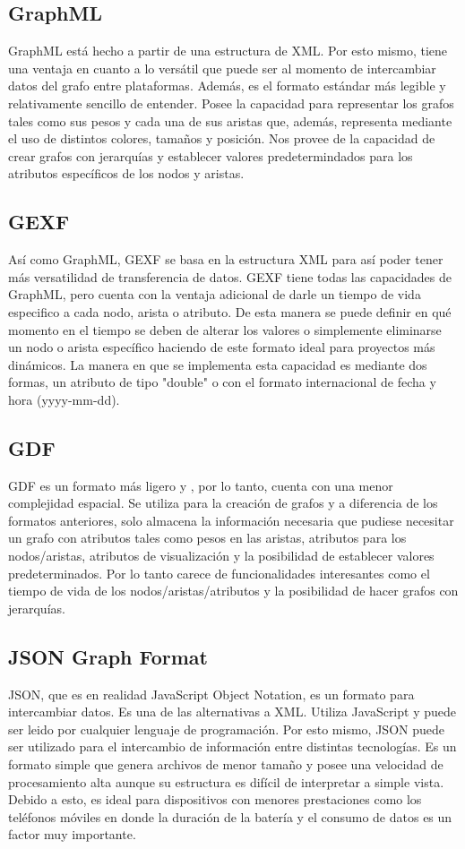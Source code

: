 \documentclass[conference]{IEEEtran}
\begin{document}
\subsection{GraphML}
GraphML está hecho a partir de una estructura de XML. Por esto mismo, tiene una ventaja en cuanto a lo versátil que puede ser al momento de intercambiar datos del grafo entre plataformas. Además, es el formato estándar más legible y relativamente sencillo de entender. Posee la capacidad para representar los grafos tales como sus pesos y cada una de sus aristas que, además, representa mediante el uso de distintos colores, tamaños y posición. Nos provee de la capacidad de crear grafos con jerarquías y establecer valores predetermindados para los atributos específicos de los nodos y aristas.
\subsection{GEXF}
Así como GraphML, GEXF se basa en la estructura XML para así poder tener más versatilidad de transferencia de datos. GEXF  tiene todas las capacidades de GraphML, pero cuenta con la ventaja adicional de darle un tiempo de vida especifico a cada nodo, arista o atributo. De esta manera se puede definir en qué momento en el tiempo se deben de alterar los valores o simplemente eliminarse un nodo o arista específico haciendo de este formato ideal para proyectos más dinámicos. La manera en que se implementa esta capacidad es mediante dos formas, un atributo de tipo "double" o con el formato internacional de fecha y hora (yyyy-mm-dd).


\subsection{GDF}
GDF es un formato más ligero y , por lo tanto,  cuenta con una menor complejidad espacial. Se utiliza para la creación de grafos y a diferencia de los formatos anteriores, solo almacena la información necesaria que pudiese necesitar un grafo con atributos tales como pesos en las aristas, atributos para los nodos/aristas, atributos de visualización y la posibilidad de establecer valores predeterminados. Por lo tanto carece de funcionalidades interesantes como el tiempo de vida de los nodos/aristas/atributos y la posibilidad de hacer grafos con jerarquías.

\subsection{JSON Graph Format}
JSON, que es en realidad JavaScript Object Notation, es un formato para intercambiar datos. Es una de las alternativas a XML. Utiliza JavaScript y puede ser leido por cualquier lenguaje de programación. Por esto mismo, JSON puede ser utilizado para el intercambio de información entre distintas tecnologías. Es un formato simple que genera archivos de menor tamaño y posee una velocidad de procesamiento alta aunque su estructura es difícil de interpretar a simple vista. Debido a esto, es ideal para dispositivos con menores prestaciones como los teléfonos móviles en donde la duración de la batería y el consumo de datos es un factor muy importante.
\end{document}
